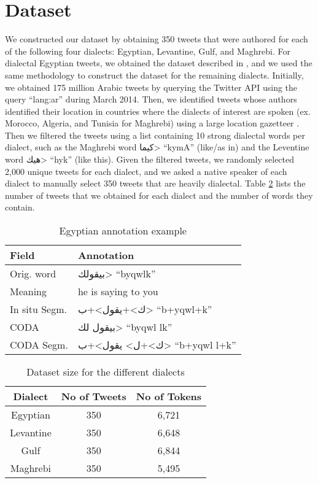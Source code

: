 \documentclass[11pt,letterpaper]{article}
\begin{document}
\section{Dataset}
\label{sec:dataset}
  We constructed our dataset by obtaining 350 tweets that were authored for each of the following four dialects: Egyptian, Levantine, Gulf, and Maghrebi. For dialectal Egyptian tweets, we obtained the dataset described in \cite{darwish2014verifiably}, and we used the same methodology to construct the dataset for the remaining dialects. Initially, we obtained 175 million Arabic tweets by querying the Twitter API using the query ``lang:ar'' during March 2014.  Then, we identified tweets whose authors identified their location in countries where the dialects of interest are spoken (ex. Morocco, Algeria, and Tunisia for Maghrebi) using a large location gazetteer \cite{mubarak2014using}.  Then we filtered the tweets using a list containing 10 strong dialectal words per dialect, such as the Maghrebi word \<كيما> ``kymA'' (like/as in) and the Leventine word \<هيك> ``hyk'' (like this).  Given the filtered tweets, we randomly selected 2,000 unique tweets for each dialect, and we asked a native speaker of each dialect to manually select 350 tweets that are heavily dialectal.  Table \ref{table:annotatedData} lists the number of tweets that we obtained for each dialect and the number of words they contain.  




\begin{table}[h]
\begin{center}
\begin{tabular}{|l|l|}
\hline \bf Field & \bf Annotation \\ \hline
Orig. word & \<بيقولك> ``byqwlk''\\
Meaning & he is saying to you \\
In situ Segm. & \<ك>+\<يقول>+\<ب> ``b+yqwl+k''\\
CODA & \<بيقول لك> ``byqwl lk''\\
CODA Segm. & \<ك>+\<ل> \<يقول>+\<ب> ``b+yqwl l+k''\\
\hline
\end{tabular}
\end{center}
\caption{Egyptian annotation example}
\vspace{-1.5em}
\label{annotations}
\end{table}

\begin{table}[h]
\begin{center}
\begin{tabular}{c|c|c}
Dialect & No of Tweets & No of Tokens \\ \hline
Egyptian & 350 & 6,721 \\
Levantine & 350 &  6,648 \\
Gulf & 350 & 6,844 \\
Maghrebi & 350 & 5,495 \\ \hline
\end{tabular}
\label{table:annotatedData}
\caption{Dataset size for the different dialects}
\end{center}
\vspace{-.75em}
\end{table}
\end{document}

